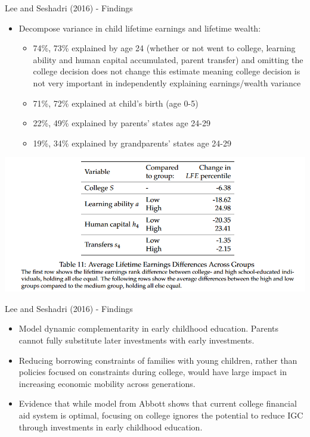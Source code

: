 \documentclass{beamer}
\begin{document}
\begin{frame}{Lee and Seshadri (2016) - Findings}
\begin{itemize}
\item Decompose variance in child lifetime earnings and lifetime wealth:
\begin{itemize} 
\item 74\%, 73\% explained by age 24 (whether or not went to college, learning ability and human capital accumulated, parent transfer) and omitting the college decision does not change this estimate meaning college decision is not very important in independently explaining earnings/wealth variance
\item 71\%, 72\% explained at child's birth (age 0-5)
\item 22\%, 49\% explained by parents' states age 24-29
\item 19\%, 34\% explained by grandparents' states  age 24-29
\end{itemize}
\end{itemize}
\includegraphics[width=\textwidth]{leeseshadri1.PNG}
\end{frame}

\begin{frame}{Lee and Seshadri (2016) - Findings}
\begin{itemize}
\item Model dynamic complementarity in early childhood education. Parents cannot fully substitute later investments with early investments.
\item Reducing borrowing constraints of families with young children, rather than policies focused on constraints during college, would have large impact in increasing economic mobility across generations.
\item Evidence that while model from Abbott shows that current college financial aid system is optimal, focusing on college ignores the potential to reduce IGC through investments in early childhood education.
\end{itemize}
\end{frame}
\end{document}
